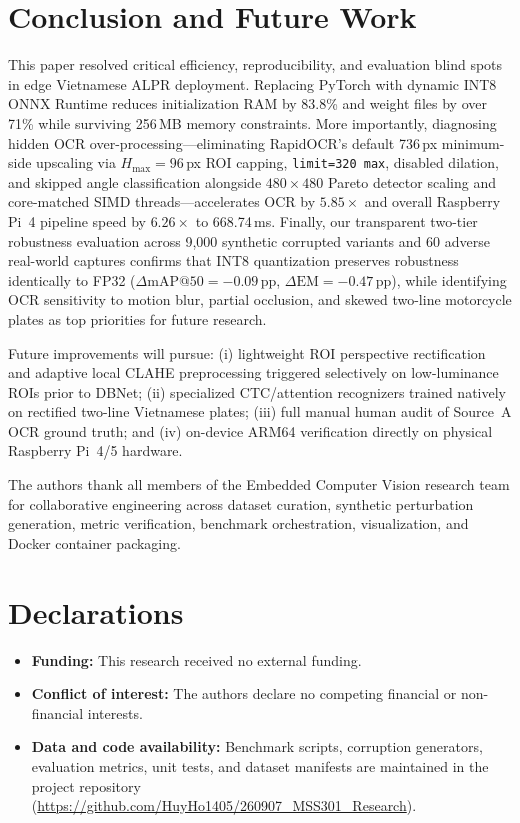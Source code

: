\documentclass[pdflatex,sn-mathphys-num]{sn-jnl}
\begin{document}
\section{Conclusion and Future Work}\label{sec:conclusion}

This paper resolved critical efficiency, reproducibility, and evaluation blind spots in edge Vietnamese ALPR deployment. Replacing PyTorch with dynamic INT8 ONNX Runtime reduces initialization RAM by 83.8\% and weight files by over 71\% while surviving 256\,MB memory constraints. More importantly, diagnosing hidden OCR over-processing---eliminating RapidOCR's default 736\,px minimum-side upscaling via $H_{\max}=96$\,px ROI capping, \texttt{limit=320 max}, disabled dilation, and skipped angle classification alongside $480\times 480$ Pareto detector scaling and core-matched SIMD threads---accelerates OCR by $5.85\times$ and overall Raspberry Pi~4 pipeline speed by $6.26\times$ to 668.74\,ms. Finally, our transparent two-tier robustness evaluation across 9,000 synthetic corrupted variants and 60 adverse real-world captures confirms that INT8 quantization preserves robustness identically to FP32 ($\Delta\text{mAP@50}=-0.09$\,pp, $\Delta\text{EM}=-0.47$\,pp), while identifying OCR sensitivity to motion blur, partial occlusion, and skewed two-line motorcycle plates as top priorities for future research.

Future improvements will pursue: (i) lightweight ROI perspective rectification and adaptive local CLAHE preprocessing triggered selectively on low-luminance ROIs prior to DBNet; (ii) specialized CTC/attention recognizers trained natively on rectified two-line Vietnamese plates; (iii) full manual human audit of Source~A OCR ground truth; and (iv) on-device ARM64 verification directly on physical Raspberry Pi~4/5 hardware.

\backmatter

The authors thank all members of the Embedded Computer Vision research team for collaborative engineering across dataset curation, synthetic perturbation generation, metric verification, benchmark orchestration, visualization, and Docker container packaging.

\section*{Declarations}
\begin{itemize}
    \item \textbf{Funding:} This research received no external funding.
    \item \textbf{Conflict of interest:} The authors declare no competing financial or non-financial interests.
    \item \textbf{Data and code availability:} Benchmark scripts, corruption generators, evaluation metrics, unit tests, and dataset manifests are maintained in the project repository (\url{https://github.com/HuyHo1405/260907_MSS301_Research}).
\end{itemize}


\end{document}
